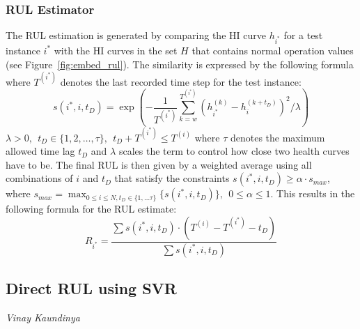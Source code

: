 \subsubsection*{RUL Estimator}
\label{sec:rul_estimation:approaches:embed_rul:rul_estimator}

The RUL estimation is generated by comparing the HI curve $h_{i^*}$ for a test instance $i^*$ with the HI curves in the set $H$ that contains normal operation values (see Figure~\ref{fig:embed_rul}). The similarity is expressed by the following formula where $T^{(i^*)}$ denotes the last recorded time step for the test instance:
\begin{equation}
    s(i^*, i, t_D) = \exp \left(-\frac{1}{T^{(i^*)}}\sum_{k=w}^{T^{(i^*)}}\left(h_{i^*}^{(k)}-h_i^{(k+t_D)}\right)^2/\lambda\right)
\end{equation}
$\lambda > 0,\ \  t_D\in \{1,2,\ldots,\tau\},\ \  t_D+T^{(i^*)}\leq T^{(i)}$ where $\tau$ denotes the maximum allowed time lag $t_D$ and $\lambda$ scales the term to control how close two health curves have to be. The final RUL is then given by a weighted average using all combinations of $i$ and $t_D$ that satisfy the constraints $s(i^*, i, t_D)\geq\alpha\cdot s_{max}$, where $s_{max}=\max_{0\leq i\leq N, t_D\in \{1,\ldots \tau\}}\{s(i^*, i, t_D)\},\ \  0\leq \alpha\leq 1$. This results in the following formula for the RUL estimate:
\begin{equation}
    R_{i^*} = \frac{\sum s(i^*, i, t_D)\cdot (T^{(i)}-T^{(i^*)}-t_D)}{\sum s(i^*, i, t_D)}
\end{equation}

\subsection{Direct RUL using SVR}
\vspace*{-12.5mm}\hfill{\normalsize\emph{Vinay Kaundinya}}
\label{sec:rul_estimation:approaches:direct_rul}


